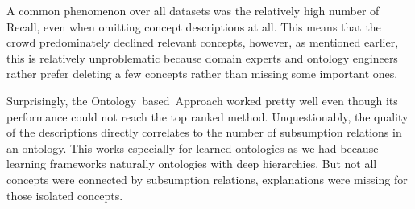 A common phenomenon over all datasets was the relatively high number of Recall, even when omitting concept descriptions at all. This means that the crowd predominately declined relevant concepts, however, as mentioned earlier, this is relatively unproblematic because domain experts and ontology engineers rather prefer deleting a few concepts rather than missing some important ones. 

Surprisingly, the Ontology~based~Approach worked pretty well even though its performance could not reach the top ranked method. Unquestionably,
the quality of the descriptions directly correlates to the number of subsumption relations in an ontology. This works especially for learned ontologies as we had because learning frameworks naturally ontologies with deep hierarchies. But not all concepts were connected by subsumption relations, explanations were missing for those isolated concepts. 


